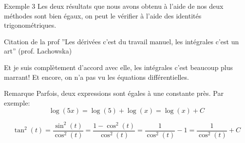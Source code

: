 \documentclass[a4paper]{article}
\begin{document}
\begin{parag}{Exemple 3}
    Les deux résultats que nous avons obtenu à l'aide de nos deux méthodes sont bien égaux, on peut le vérifier à l'aide des identités trigonométriques.

    \begin{subparag}{Citation de la prof}
        ''Les dérivées c'est du travail manuel, les intégrales c'est un art'' (prof. Lachowska)

        Et je suis complètement d'accord avec elle, les intégrales c'est beaucoup plus marrant! Et encore, on n'a pas vu les équations différentielles. \smiley
    \end{subparag}

\end{parag}

\begin{parag}{Remarque}
    Parfois, deux expressions sont égales à une constante près. Par exemple:
    \[\log\left(5x\right) = \log\left(5\right) + \log\left(x\right) = \log\left(x\right) + C\]

    \[\tan^2\left(t\right) = \frac{\sin^2\left(t\right)}{\cos^2\left(t\right)} = \frac{1 - \cos^2\left(t\right)}{\cos^2\left(t\right)} = \frac{1}{\cos^2\left(t\right)} - 1 = \frac{1}{\cos^2\left(t\right)} + C\]
\end{parag}
\end{document}
